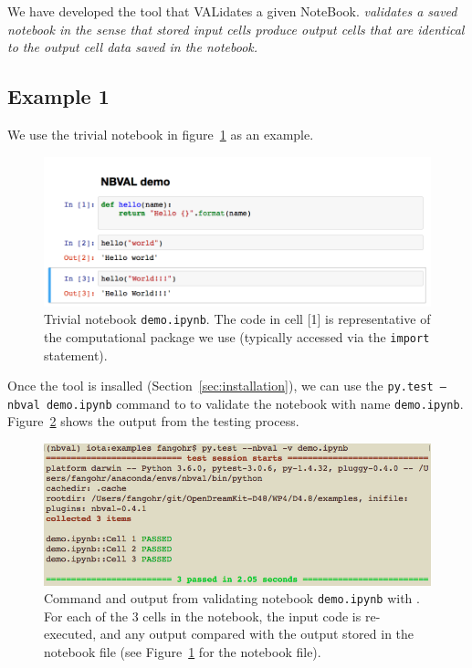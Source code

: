 \documentclass{deliverablereport}
\begin{document}
We have developed the \nbval tool that VALidates a given
NoteBook. \emph{\nbval validates a saved notebook in the sense that stored
input cells produce output cells that are identical to the output cell
data saved in the notebook.}

\subsection{Example 1}
We use the trivial notebook in figure~\ref{fig:demo-ipynb} as an
example.

\begin{figure}[ht]
  \centering
  \includegraphics[width=1\textwidth]{examples/demo.png}
  \caption{Trivial notebook \texttt{demo.ipynb}. The code in cell [1] is
    representative of the computational package we use (typically
    accessed via the \texttt{import} statement).\label{fig:demo-ipynb}}
\end{figure}

Once the \nbval tool is insalled (Section~\ref{sec:installation}), we
can use the \texttt{py.test --nbval demo.ipynb} command to to validate
the notebook with name
\texttt{demo.ipynb}. Figure~\ref{fig:demo-pytest} shows the output
from the testing process.

\begin{figure}[ht]
  \centering
  \includegraphics[width=1\textwidth]{examples/demo-pytest.png}
  \caption{\nbval Command and output from validating notebook
    \texttt{demo.ipynb} with \nbval. For each of the 3 cells in the notebook,
    the input code is re-executed, and any output compared with the
    output stored in the notebook file (see
    Figure~\ref{fig:demo-ipynb} for the notebook file).\label{fig:demo-pytest}}
\end{figure}
\end{document}
